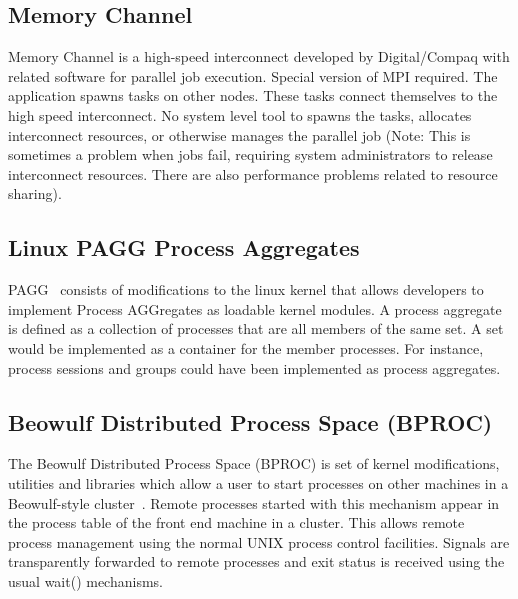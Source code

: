 \subsection*{Memory Channel}

Memory Channel is a high-speed interconnect developed by 
Digital/Compaq with related software for parallel job execution. 
Special version of MPI required. The application spawns tasks on 
other nodes. These tasks connect themselves to the high speed 
interconnect. No system level tool to spawns the tasks, allocates 
interconnect resources, or otherwise manages the parallel job (Note: 
This is sometimes a problem when jobs fail, requiring system 
administrators to release interconnect resources. There are also 
performance problems related to resource sharing).

\subsection*{Linux PAGG Process Aggregates}


PAGG~\cite{PAGG}
consists of modifications to the linux kernel that allows
developers to implement Process AGGregates as loadable kernel modules.
A process aggregate is defined as a collection of processes that are
all members of the same set. A set would be implemented as a container
for the member processes. For instance, process sessions and groups
could have been implemented as process aggregates.

\subsection*{Beowulf Distributed Process Space (BPROC)}


The Beowulf Distributed Process Space 
(BPROC)
is set of kernel
modifications, utilities and libraries which allow a user to start
processes on other machines in a Beowulf-style cluster~\cite{BProc}.  Remote
processes started with this mechanism appear in the process table
of the front end machine in a cluster. This allows remote process
management using the normal UNIX process control facilities. Signals
are transparently forwarded to remote processes and exit status is
received using the usual wait() mechanisms.

%
%
%
%
%
%
